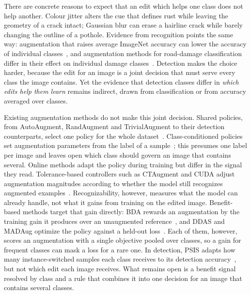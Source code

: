 There are concrete reasons to expect that an edit which helps one class does not help another. Colour jitter alters the cue that defines rust while leaving the geometry of a crack intact; Gaussian blur can erase a hairline crack while barely changing the outline of a pothole. Evidence from recognition points the same way: augmentation that raises average ImageNet accuracy can lower the accuracy of individual classes~\cite{kirichenko2023}, and augmentation methods for road-damage classification differ in their effect on individual damage classes~\cite{tsuchiya2019}. Detection makes the choice harder, because the edit for an image is a joint decision that must serve every class the image contains. Yet the evidence that detection classes differ in \emph{which edits help them learn} remains indirect, drawn from classification or from accuracy averaged over classes.

Existing augmentation methods do not make this joint decision. Shared policies, from AutoAugment, RandAugment and TrivialAugment to their detection counterparts, select one policy for the whole dataset~\cite{cubuk2019auto,cubuk2020rand,muller2021trivial,zoph2020det,chen2021scale}. Class-conditioned policies set augmentation parameters from the label of a sample~\cite{yoo2023,cheung2022adaaug,ahn2023cuda}; this presumes one label per image and leaves open which class should govern an image that contains several. Online methods adapt the policy during training but differ in the signal they read. Tolerance-based controllers such as CTAugment and CUDA adjust augmentation magnitudes according to whether the model still recognizes augmented examples~\cite{berthelot2020,ahn2023cuda}. Recognizability, however, measures what the model can already handle, not what it gains from training on the edited image. Benefit-based methods target that gain directly: BDA rewards an augmentation by the training gain it produces over an unaugmented reference~\cite{lu2023bda}, and DDAS and MADAug optimize the policy against a held-out loss~\cite{liu2021ddas,hou2023madaug}. Each of them, however, scores an augmentation with a single objective pooled over classes, so a gain for frequent classes can mask a loss for a rare one. In detection, PSIS adapts how many instance-switched samples each class receives to its detection accuracy~\cite{wang2019psis}, but not which edit each image receives. What remains open is a benefit signal resolved by class and a rule that combines it into one decision for an image that contains several classes.

